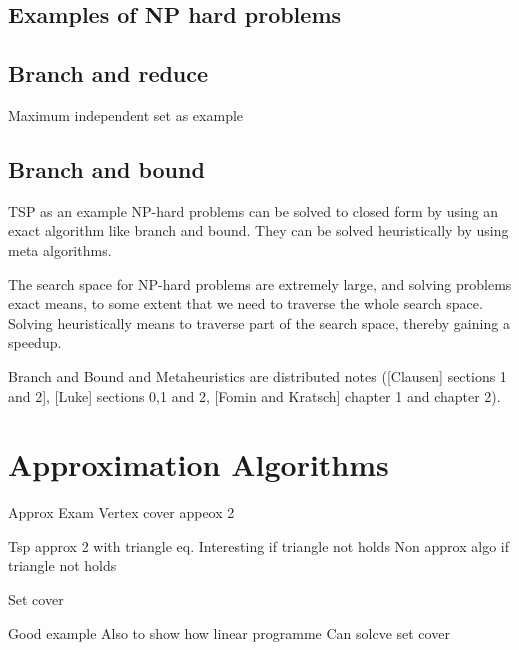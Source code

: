 \documentclass[10pt]{article}
\begin{document}
\subsection{Examples of NP hard problems} %
\label{sub:exmaples_of_np_hard_problems}



\subsection{Branch and reduce} %
\label{sub:branch_and_reduce}
Maximum independent set as example



\subsection{Branch and bound} %
\label{sub:branch_and_bound}
TSP as an example
NP-hard problems can be solved to closed form by using an exact algorithm like branch and bound. They can be solved heuristically by using meta algorithms.

The search space for NP-hard problems are extremely large, and solving problems exact means, to some extent that we need to traverse the whole search space. Solving heuristically means to traverse part of the search space, thereby gaining a speedup.



Branch and Bound and Metaheuristics are  distributed notes ([Clausen] sections 1 and 2], [Luke] sections 0,1 and 2, [Fomin and Kratsch] chapter 1 and chapter 2).                                                                                                                                                          
\clearpage \newpage
\section{Approximation Algorithms} %
\label{sec:approximation_algorithms}

Approx Exam
Vertex cover appeox 2

Tsp approx 2 with triangle eq. Interesting if triangle not holds
Non approx algo if triangle not holds

Set cover

Good example Also to show how linear programme Can solcve set cover
\end{document}
